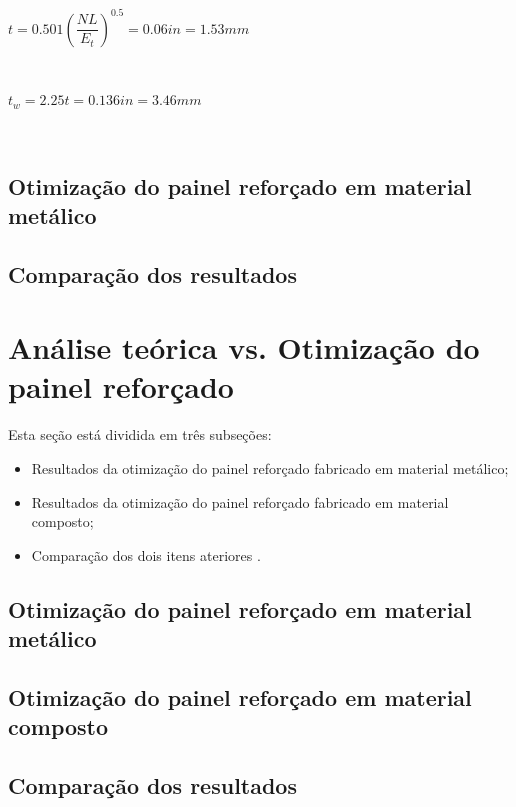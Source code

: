 \centerline{$t = 0.501({\dfrac{NL}{E_t}})^{0.5} = 0.06 in = 1.53 mm$}\

\centerline{$t_w = 2.25t = 0.136in = 3.46 mm$}\


\subsection{Otimização do painel reforçado em material metálico}

\subsection{Comparação dos resultados}

\section{Análise teórica vs. Otimização do painel reforçado}
Esta seção está dividida em três subseções:
\begin{itemize}
\item Resultados da otimização do painel reforçado fabricado em material metálico;
\item Resultados da otimização do painel reforçado fabricado em material composto;
\item Comparação dos dois itens ateriores .
\end{itemize}

\subsection{Otimização do painel reforçado em material metálico}

\subsection{Otimização do painel reforçado em material composto}

\subsection{Comparação dos resultados}
